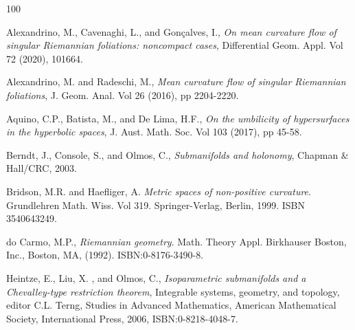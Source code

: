\documentclass[12pt]{article}
\begin{document}
	
\begin{thebibliography}{100}
	
 Alexandrino, M., Cavenaghi, L., and Gon\c{c}alves, I., {\it On mean curvature flow of singular Riemannian foliations: noncompact cases}, Differential Geom. Appl. Vol 72 (2020), 101664.
	
 Alexandrino, M. and Radeschi, M., {\it Mean curvature flow of singular Riemannian foliations}, J. Geom. Anal. Vol 26 (2016), pp 2204-2220.


 Aquino, C.P.,  Batista, M., and De Lima, H.F., {\it On the umbilicity of hypersurfaces in the hyperbolic spaces}, J. Aust. Math. Soc. Vol 103 (2017), pp 45-58.


 Berndt, J., Console, S., and Olmos, C., {\it Submanifolds and holonomy}, Chapman \& Hall/CRC, 2003.

 Bridson, M.R. and Haefliger, A. {\it Metric spaces of non-positive curvature}. Grundlehren Math. Wiss. Vol 319. Springer-Verlag, Berlin, 1999. ISBN 3540643249.


	



 do Carmo, M.P., {\it Riemannian geometry}. Math. Theory Appl. Birkhauser Boston, Inc., Boston, MA, (1992). ISBN:0-8176-3490-8.


 Heintze, E.,  Liu, X. , and  Olmos, C.,  {\it Isoparametric submanifolds and a Chevalley-type restriction theorem}, Integrable systems, geometry, and topology, editor C.L. Terng, Studies in Advanced Mathematics, American Mathematical Society, International Press, 2006,  ISBN:0-8218-4048-7.


\end{thebibliography}
\end{document}
